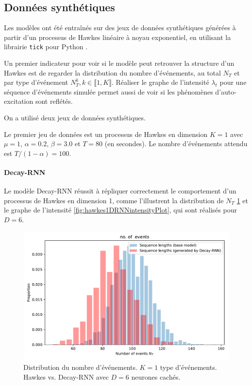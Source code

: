 \documentclass[../main.tex]{subfiles}
\begin{document}
\subsection{Données synthétiques}\label{ssec:synthResults}

Les modèles ont été entraînés sur des jeux de données synthétiques générées à partir d'un processus de Hawkes linéaire à noyau exponentiel, en utilisant la librairie \verb|tick| pour Python \cite{2017arXiv170703003B}.

Un premier indicateur pour voir si le modèle peut retrouver la structure d'un Hawkes est de regarder la distribution du nombre d'événements, au total $N_T$ et par type d'événement $N^k_T, k\in\llbracket 1,K\rrbracket$. Réaliser le graphe de l'intensité $\lambda_t$ pour une séquence d'événements simulée permet aussi de voir si les phénomènes d'auto-excitation sont reflétés.

On a utilisé deux jeux de données synthétiques.

Le premier jeu de données est un processus de Hawkes en dimension $K=1$ avec $\mu=1$, $\alpha = \num{0.2}$, $\beta = \num{3.0}$ et $T = \num{80}$ (en secondes). Le nombre d'événements attendu est $T/(1-\alpha) = \num{100}$.

\paragraph{Decay-RNN}
Le modèle Decay-RNN réussit à répliquer correctement le comportement d'un processus de Hawkes en dimension 1, comme l'illustrent la distribution de $N_T$ \cref{fig:hawkes1DDecayRNNlengthDistrib} et le graphe de l'intensité \cref{fig:hawkes1DRNNintensityPlot}, qui sont réalisés pour $D=6$.\footnotemark


\begin{figure}[htp]
	\includegraphics[width=\linewidth]{../results/seq_length_distrib_Decay-RNN-1d-hidden_8-20181202-140621.pdf}
	\caption{Distribution du nombre d'événements. $K=1$ type d'événements. Hawkes vs. Decay-RNN avec $D=6$ neurones cachés.}\label{fig:hawkes1DDecayRNNlengthDistrib}
\end{figure}
\end{document}
